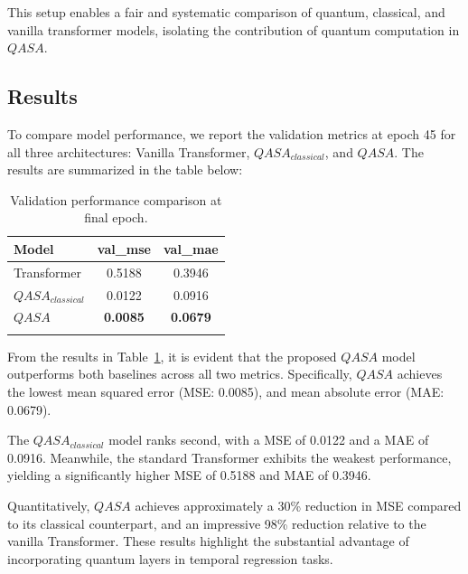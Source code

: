 \documentclass[conference]{IEEEtran}
\begin{document}
This setup enables a fair and systematic comparison of quantum, classical, and vanilla transformer models, isolating the contribution of quantum computation in $QASA$.



\subsection{Results}
To compare model performance, we report the validation metrics at epoch 45 for all three architectures: Vanilla Transformer, $QASA_{classical}$, and $QASA$. The results are summarized in the table below:

\begin{table}[h]
\centering
\caption{Validation performance comparison at final epoch.}
\begin{tabular}{l c c}
\hline
\textbf{Model} & \textbf{val\_mse} & \textbf{val\_mae} \\
\hline
Transformer &  0.5188 & 0.3946 \\
$QASA_{classical}$ &  0.0122 & 0.0916 \\
$QASA$ &  \textbf{0.0085} & \textbf{0.0679} \\
\hline
\label{tab:mae_mse}
\end{tabular}
\end{table}


From the results in Table~\ref{tab:mae_mse}, it is evident that the proposed $QASA$ model outperforms both baselines across all two metrics. Specifically, $QASA$ achieves the lowest mean squared error (MSE: 0.0085), and mean absolute error (MAE: 0.0679).

The $QASA_{classical}$ model ranks second, with a MSE of 0.0122 and a MAE of 0.0916. Meanwhile, the standard Transformer exhibits the weakest performance, yielding a significantly higher MSE of 0.5188 and MAE of 0.3946.

Quantitatively, $QASA$ achieves approximately a 30\% reduction in MSE compared to its classical counterpart, and an impressive 98\% reduction relative to the vanilla Transformer. These results highlight the substantial advantage of incorporating quantum layers in temporal regression tasks.
\end{document}
